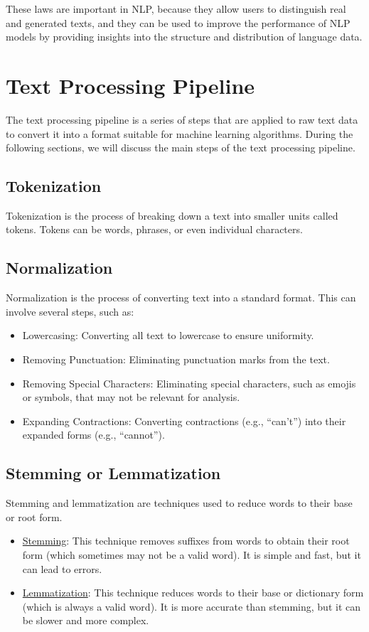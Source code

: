 These laws are important in NLP, because they allow users to distinguish real and generated texts, and they can be used to improve the performance of NLP models by providing insights into the structure and distribution of language data.

\section{Text Processing Pipeline}


The text processing pipeline is a series of steps that are applied to raw text data to convert it into a format suitable for machine learning algorithms. During the following sections, we will discuss the main steps of the text processing pipeline.

\subsection{Tokenization}

Tokenization is the process of breaking down a text into smaller units called tokens. Tokens can be words, phrases, or even individual characters. 

\subsection{Normalization}

Normalization is the process of converting text into a standard format. This can involve several steps, such as:
\begin{itemize}
    \item Lowercasing: Converting all text to lowercase to ensure uniformity.
    \item Removing Punctuation: Eliminating punctuation marks from the text.
    \item Removing Special Characters: Eliminating special characters, such as emojis or symbols, that may not be relevant for analysis.
    \item Expanding Contractions: Converting contractions (e.g., ``can't'') into their expanded forms (e.g., ``cannot'').
\end{itemize}

\subsection{Stemming or Lemmatization}


Stemming and lemmatization are techniques used to reduce words to their base or root form.
\begin{itemize}
    \item \ul{Stemming}: This technique removes suffixes from words to obtain their root form (which sometimes may not be a valid word). It is simple and fast, but it can lead to errors.
    \item \ul{Lemmatization}: This technique reduces words to their base or dictionary form (which is always a valid word). It is more accurate than stemming, but it can be slower and more complex.
\end{itemize}

